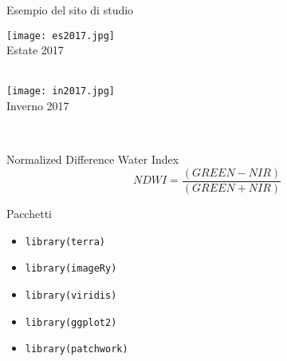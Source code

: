 \documentclass{beamer} %
\begin{document}
        \begin{frame}{Esempio del sito di studio}
                \begin{multicols}{2}
                    \begin{center}
                        \texttt{[image: es2017.jpg]}\\
                        \caption{{\scriptsize Estate 2017}}\\
                \columnbreak
                        \texttt{[image: in2017.jpg]}\\
                        \caption{{\scriptsize Inverno 2017}}\\
                    \end{center}
                \end{multicols}
        \end{frame}
        
        \begin{frame}{Normalized Difference Water Index}
            \begin{equation}
                NDWI = \frac{(GREEN - NIR)}{(GREEN + NIR)}
            \end{equation}
        \end{frame}
        
        \begin{frame}{Pacchetti}
            \begin{itemize}
                \item    \texttt{library(terra)} 
                \item    \texttt{library(imageRy)} 
                \item    \texttt{library(viridis)}
                \item    \texttt{library(ggplot2)} 
                \item    \texttt{library(patchwork)}
            \end{itemize}
        \end{frame}
        
\end{document}
